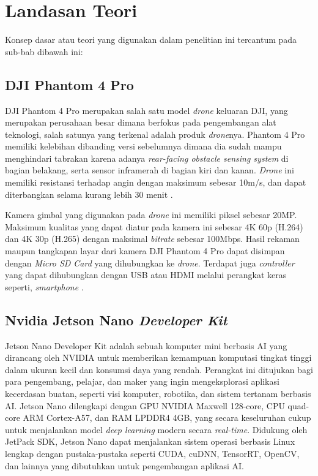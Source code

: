 \section{Landasan Teori}
Konsep dasar atau teori yang digunakan dalam penelitian ini tercantum pada sub-bab dibawah ini:

\subsection{DJI Phantom 4 Pro}
DJI Phantom 4 Pro merupakan salah satu model \emph{drone} keluaran DJI, yang merupakan perusahaan besar dimana berfokus pada pengembangan alat teknologi, salah satunya yang terkenal adalah produk \emph{drone}nya. Phantom 4 Pro memiliki kelebihan dibanding versi sebelumnya dimana dia sudah mampu menghindari tabrakan karena adanya \emph{rear-facing obstacle sensing system} di bagian belakang, serta sensor inframerah di bagian kiri dan kanan. \emph{Drone} ini memiliki resistansi terhadap angin dengan maksimum sebesar 10m/s, dan dapat diterbangkan selama kurang lebih 30 menit \cite{djiphantom4pro}.

Kamera gimbal yang digunakan pada \emph{drone} ini memiliki piksel sebesar 20MP. Maksimum kualitas yang dapat diatur pada kamera ini sebesar 4K 60p (H.264) dan 4K 30p (H.265) dengan maksimal \emph{bitrate} sebesar 100Mbps. Hasil rekaman maupun tangkapan layar dari kamera DJI Phantom 4 Pro dapat disimpan dengan \emph{Micro SD Card} yang dihubungkan ke \emph{drone}. Terdapat juga \emph{controller} yang dapat dihubungkan dengan USB atau HDMI melalui perangkat keras seperti, \emph{smartphone} \cite{djiphantom4pro}. 

\subsection{Nvidia Jetson Nano \emph{Developer Kit}}

Jetson Nano Developer Kit adalah sebuah komputer mini berbasis AI yang dirancang oleh NVIDIA untuk memberikan kemampuan komputasi tingkat tinggi dalam ukuran kecil dan konsumsi daya yang rendah. Perangkat ini ditujukan bagi para pengembang, pelajar, dan maker yang ingin mengeksplorasi aplikasi kecerdasan buatan, seperti visi komputer, robotika, dan sistem tertanam berbasis AI. Jetson Nano dilengkapi dengan GPU NVIDIA Maxwell 128-core, CPU quad-core ARM Cortex-A57, dan RAM LPDDR4 4GB, yang secara keseluruhan cukup untuk menjalankan model \emph{deep learning} modern secara \emph{real-time}. Didukung oleh JetPack SDK, Jetson Nano dapat menjalankan sistem operasi berbasis Linux lengkap dengan pustaka-pustaka seperti CUDA, cuDNN, TensorRT, OpenCV, dan lainnya yang dibutuhkan untuk pengembangan aplikasi AI.

